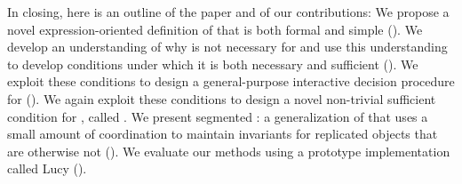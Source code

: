 In closing, here is an outline of the paper and of our contributions:
%
We propose a novel expression-oriented definition of \invariantconfluence{}
that is both formal and simple ().
%
We develop an understanding of why \invariantclosure{} is not necessary for
\invariantconfluence{} and use this understanding to develop conditions under
which it is both necessary and sufficient ().
%
We exploit these conditions to design a general-purpose interactive decision
procedure for \invariantconfluence{} ().
%
We again exploit these conditions to design a novel non-trivial sufficient
condition for \invariantconfluence{}, called \mergereducibility.
%
We present segmented \invariantconfluence{}: a generalization of
\invariantconfluence{} that uses a small amount of coordination to maintain
invariants for replicated objects that are otherwise not \invariantconfluent{}
().
%
We evaluate our methods using a prototype implementation called Lucy
().
